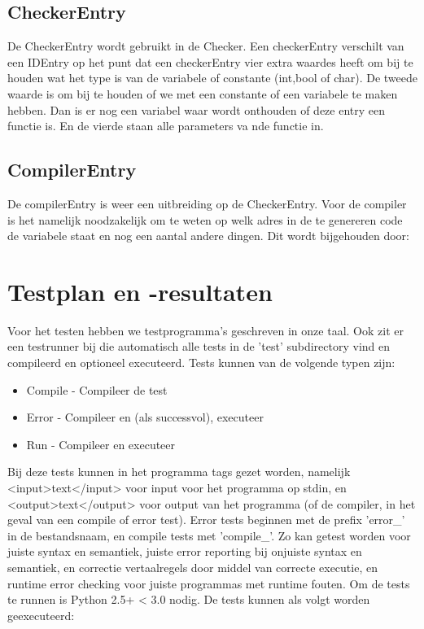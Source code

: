 \documentclass[]{article}
\begin{document}
\subsection{CheckerEntry}
De CheckerEntry wordt gebruikt in de Checker. Een checkerEntry verschilt van een IDEntry op het punt dat een checkerEntry vier extra waardes heeft om bij te houden wat het type is van de variabele of constante (int,bool of char). De tweede waarde is om bij te houden of we met een constante of een variabele te maken hebben. Dan is er nog een variabel waar wordt onthouden of deze entry een functie is. En de vierde staan alle parameters va nde functie in.


\subsection{CompilerEntry}
De compilerEntry is weer een uitbreiding op de CheckerEntry. Voor de compiler is het namelijk noodzakelijk om te weten op welk adres in de te genereren code de variabele staat en nog een aantal andere dingen. Dit wordt bijgehouden door:


\newpage
\section{Testplan en -resultaten}
Voor het testen hebben we testprogramma's geschreven in onze taal. Ook zit er een testrunner bij die automatisch alle tests in de 'test' subdirectory vind en compileerd en optioneel executeerd.
Tests kunnen van de volgende typen zijn:
\begin{itemize}
	\item Compile - Compileer de test
	\item Error	    - Compileer en (als successvol), executeer
	\item Run		    - Compileer en executeer
\end{itemize}

Bij deze tests kunnen in het programma tags gezet worden, namelijk <input>text</input> voor input voor het programma op stdin, en <output>text</output> voor output van het programma (of de compiler, in het geval van een compile of error test). Error tests beginnen met de prefix 'error\_' in de bestandsnaam, en compile tests met 'compile\_'. Zo kan getest worden voor juiste syntax en semantiek, juiste error reporting bij onjuiste syntax en semantiek, en correctie vertaalregels door middel van correcte executie, en runtime error checking voor juiste programmas met runtime fouten. Om de tests te runnen is Python 2.5+ < 3.0 nodig. De tests kunnen als volgt worden geexecuteerd:
\end{document}
